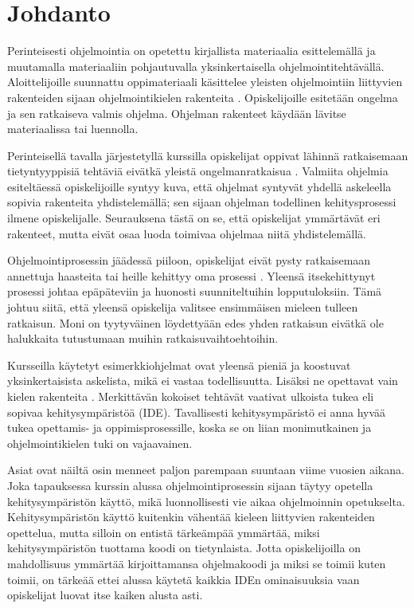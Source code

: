 \section{Johdanto}

Perinteisesti ohjelmointia on opetettu kirjallista materiaalia esittelemällä ja
muutamalla materiaaliin pohjautuvalla yksinkertaisella ohjelmointitehtävällä.
Aloittelijoille suunnattu oppimateriaali käsittelee yleisten ohjelmointiin
liittyvien rakenteiden sijaan ohjelmointikielen rakenteita
\cite{Caspersen:2006:NPO:1176617.1176741, Vihavainen:2011:EAM:1953163.1953196}.
Opiskelijoille esitetään ongelma ja sen ratkaiseva valmis ohjelma. Ohjelman
rakenteet käydään lävitse materiaalissa tai luennolla.

Perinteisellä tavalla järjestetyllä kurssilla opiskelijat oppivat lähinnä
ratkaisemaan tietyntyyppisiä tehtäviä eivätkä yleistä ongelmanratkaisua
\cite{Gries:1974:WTI:953057.810447}. Valmiita ohjelmia esiteltäessä
opiskelijoille syntyy kuva, että ohjelmat syntyvät yhdellä askeleella sopivia
rakenteita yhdistelemällä; sen sijaan ohjelman todellinen kehitysprosessi ilmene
opiskelijalle.  Seurauksena tästä on se, että opiskelijat ymmärtävät eri
rakenteet, mutta eivät osaa luoda toimivaa ohjelmaa niitä yhdistelemällä.

Ohjelmointiprosessin jäädessä piiloon, opiskelijat eivät pysty ratkaisemaan
annettuja haasteita tai heille kehittyy oma prosessi
\cite{Caspersen:2006:NPO:1176617.1176741}. Yleensä itsekehittynyt prosessi
johtaa epäpäteviin ja huonosti suunniteltuihin lopputuloksiin. Tämä johtuu
siitä, että yleensä opiskelija valitsee ensimmäisen mieleen tulleen ratkaisun.
Moni on tyytyväinen löydettyään edes yhden ratkaisun eivätkä ole halukkaita
tutustumaan muihin ratkaisuvaihtoehtoihin.

Kursseilla käytetyt esimerkkiohjelmat ovat yleensä pieniä ja koostuvat
yksinkertaisista askelista, mikä ei vastaa todellisuutta. Lisäksi ne opettavat
vain kielen rakenteita \cite{Astrachan:1995:ACA:199691.199694}. Merkittävän
kokoiset tehtävät vaativat ulkoista tukea \cite{Kolling:2008} eli sopivaa
kehitysympäristöä (IDE). Tavallisesti kehitysympäristö ei anna hyvää tukea
opettamis- ja oppimisprosessille, koska se on liian monimutkainen ja
ohjelmointikielen tuki on vajaavainen.

Asiat ovat näiltä osin menneet paljon parempaan suuntaan viime vuosien aikana.
Joka tapauksessa kurssin alussa ohjelmointiprosessin sijaan täytyy opetella
kehitysympäristön käyttö, mikä luonnollisesti vie aikaa ohjelmoinnin
opetukselta. Kehitysympäristön käyttö kuitenkin vähentää kieleen liittyvien
rakenteiden opettelua, mutta silloin on entistä tärkeämpää ymmärtää, miksi
kehitysympäristön tuottama koodi on tietynlaista. Jotta opiskelijoilla on
mahdollisuus ymmärtää kirjoittamansa ohjelmakoodi ja miksi se toimii kuten
toimii, on tärkeää ettei alussa käytetä kaikkia IDEn ominaisuuksia vaan
opiskelijat luovat itse kaiken alusta asti.

